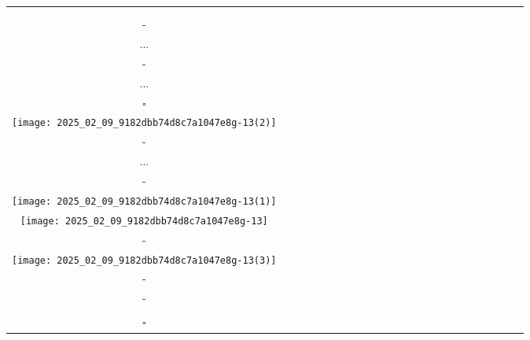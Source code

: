 \documentclass[10pt]{article}
\begin{document}
\begin{center}
\begin{tabular}{|c|c|c|c|c|c|c|c|c|c|c|c|c|c|c|c|c|c|c|c|c|c|c|}
\hline
 &  &  &  &  &  &  &  &  &  &  &  &  &  &  &  &  &  &  &  &  &  &  \\
\hline
 &  &  &  &  &  &  &  &  &  &  &  &  &  &  &  &  &  &  &  &  &  &  \\
\hline
 &  &  &  &  &  &  &  &  &  &  &  &  &  &  &  &  &  &  &  &  &  &  \\
\hline
- &  &  &  &  &  &  &  &  &  &  &  &  &  &  &  &  &  &  &  &  &  &  \\
\hline
\( \ldots \) &  &  &  &  &  &  &  &  &  &  &  &  &  &  &  &  &  &  &  &  &  &  \\
\hline
- &  &  &  &  &  &  &  &  &  &  &  &  &  &  &  &  &  &  &  &  &  &  \\
\hline
\( \ldots \) &  &  &  &  &  &  &  &  &  &  &  &  &  &  &  &  &  &  &  &  &  &  \\
\hline
\(\square\) &  &  &  &  &  &  &  &  &  &  &  &  &  &  &  &  &  &  &  &  &  &  \\
\hline
\texttt{[image: 2025\_02\_09\_9182dbb74d8c7a1047e8g-13(2)]}
 &  &  &  &  &  &  &  &  &  &  &  &  &  &  &  &  &  &  &  &  &  &  \\
\hline
- &  &  &  &  &  &  &  &  &  &  &  &  &  &  &  &  &  &  &  &  &  &  \\
\hline
\( \ldots \) &  &  &  &  &  &  &  &  &  &  &  &  &  &  &  &  &  &  &  &  &  &  \\
\hline
- &  &  &  &  &  &  &  &  &  &  &  &  &  &  &  &  &  &  &  &  &  &  \\
\hline
\texttt{[image: 2025\_02\_09\_9182dbb74d8c7a1047e8g-13(1)]}
 &  &  &  &  &  &  &  &  &  &  &  &  &  &  &  &  &  &  &  &  &  &  \\
\hline
\texttt{[image: 2025\_02\_09\_9182dbb74d8c7a1047e8g-13]}
 &  &  &  &  &  &  &  &  &  &  &  &  &  &  &  &  &  &  &  &  &  &  \\
\hline
- &  &  &  &  &  &  &  &  &  &  &  &  &  &  &  &  &  &  &  &  &  &  \\
\hline
\texttt{[image: 2025\_02\_09\_9182dbb74d8c7a1047e8g-13(3)]}
 &  &  &  &  &  &  &  &  &  &  &  &  &  &  &  &  &  &  &  &  &  &  \\
\hline
- &  &  &  &  &  &  &  &  &  &  &  &  &  &  &  &  &  &  &  &  &  &  \\
\hline
- &  &  &  &  &  &  &  &  &  &  &  &  &  &  &  &  &  &  &  &  &  &  \\
\hline
 &  &  &  &  &  &  &  &  &  &  &  &  &  &  &  &  &  &  &  &  &  &  \\
\hline
\(\square\) &  &  &  &  &  &  &  &  &  &  &  &  &  &  &  &  &  &  &  &  &  &  \\

\end{tabular}
\end{center}
\end{document}
